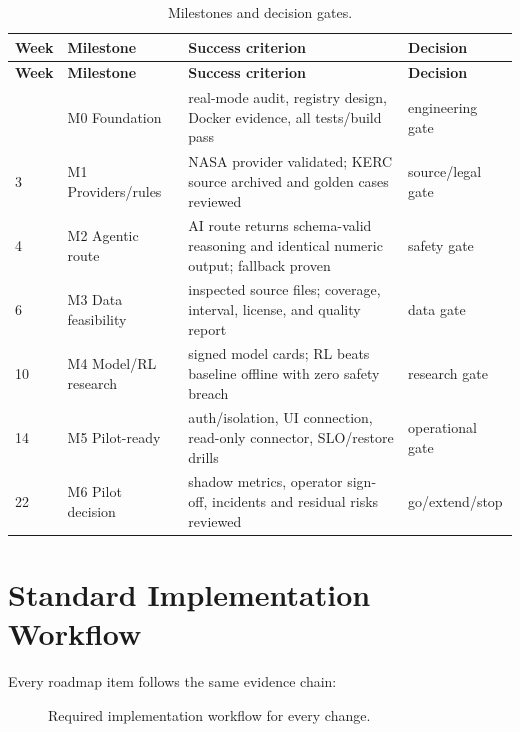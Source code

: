 \begin{footnotesize}
\begin{longtable}{@{}L{1.5cm}L{4.2cm}L{6.4cm}L{2.5cm}@{}}
\caption{Milestones and decision gates.}\label{tab:milestones}\\
\toprule
\textbf{Week} & \textbf{Milestone} & \textbf{Success criterion} & \textbf{Decision}\\
\midrule
\endfirsthead
\toprule
\textbf{Week} & \textbf{Milestone} & \textbf{Success criterion} & \textbf{Decision}\\
\midrule
\endhead
\bottomrule
{} & M0 Foundation & real-mode audit, registry design, Docker evidence, all tests/build pass &
engineering gate\\
3 & M1 Providers/rules & NASA provider validated; KERC source archived and golden cases reviewed &
source/legal gate\\
4 & M2 Agentic route & AI route returns schema-valid reasoning and identical numeric output;
fallback proven & safety gate\\
6 & M3 Data feasibility & inspected source files; coverage, interval, license, and quality report &
data gate\\
10 & M4 Model/RL research & signed model cards; RL beats baseline offline with zero safety breach &
research gate\\
14 & M5 Pilot-ready & auth/isolation, UI connection, read-only connector, SLO/restore drills &
operational gate\\
22 & M6 Pilot decision & shadow metrics, operator sign-off, incidents and residual risks reviewed &
go/extend/stop\\
\end{longtable}
\end{footnotesize}

\section{Standard Implementation Workflow}

Every roadmap item follows the same evidence chain:

\begin{figure}[H]
\centering
{}
\caption{Required implementation workflow for every change.}
\end{figure}


